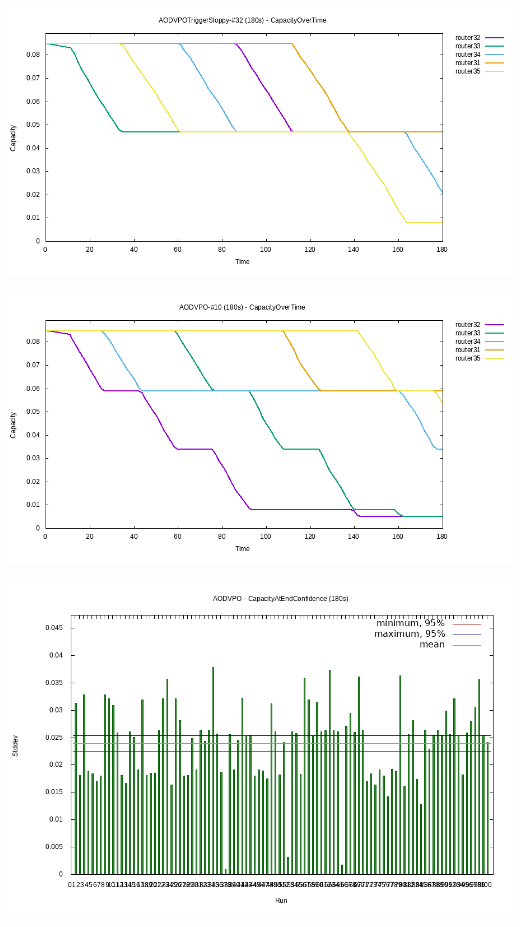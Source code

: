 \documentclass[11pt,landscape]{beamer}
\begin{document}
\begin{frame}{\insertsubsection}
\includegraphics[scale=0.45]{aodvposloppy-captime}
\end{frame}

\begin{frame}{\insertsubsection}
\includegraphics[scale=0.45]{aodvpo-captime-bad}
\end{frame}

\begin{frame}{\insertsubsection}
\includegraphics[scale=0.45]{aodvpo-100}
\end{frame}
\end{document}
